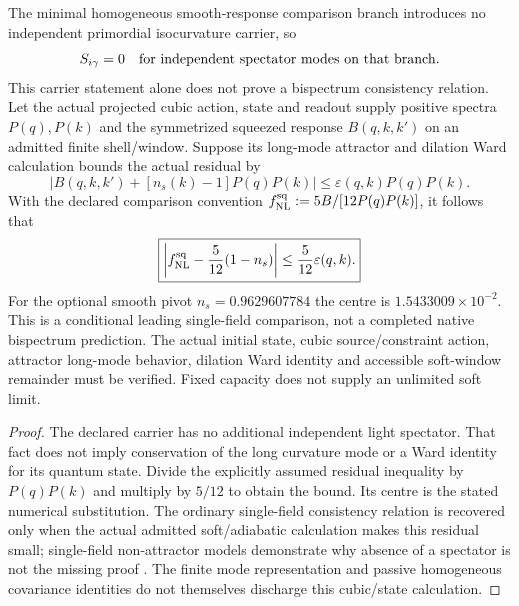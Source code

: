 \documentclass[12pt,a4paper]{article}
\begin{document}
\begin{corollary}
\label{p8:cor:minimal-adiabatic-fnl}
The minimal homogeneous smooth-response comparison branch introduces no
independent primordial isocurvature carrier, so
\begin{equation}
\label{p8:eq:minimal-isocurvature-zero}
 S_{i\gamma}=0\quad\hbox{for independent spectator modes on that branch}.
\end{equation}
This carrier statement alone does not prove a bispectrum consistency
relation. Let the actual projected cubic action, state and readout supply
positive spectra $P(q),P(k)$ and the symmetrized squeezed response
$B(q,k,k')$ on an admitted finite shell/window. Suppose its long-mode
attractor and dilation Ward calculation bounds the actual residual by
\[
 |B(q,k,k')+[n_s(k)-1]P(q)P(k)|
 \le\varepsilon(q,k)P(q)P(k).
\]
With the declared comparison convention
$f_{\rm NL}^{\rm sq}:=5B/[12P(q)P(k)]$, it follows that
\begin{equation}
\label{p8:eq:single-field-fnl-local}
 \boxed{\left|f_{\rm NL}^{\rm sq}-\frac5{12}(1-n_s)\right|
 \le\frac5{12}\varepsilon(q,k).}
\end{equation}
For the optional smooth pivot $n_s=0.9629607784$ the centre is
$1.5433009\times10^{-2}$. This is a conditional leading single-field
comparison, not a completed native bispectrum prediction. The actual
initial state, cubic source/constraint action, attractor long-mode
behavior, dilation Ward identity and accessible soft-window remainder
must be verified. Fixed capacity does not supply an unlimited soft limit.
\end{corollary}
\begin{proof}
The declared carrier has no additional independent light spectator.
That fact does not imply conservation of the long curvature mode or a
Ward identity for its quantum state. Divide the explicitly assumed
residual inequality by $P(q)P(k)$ and multiply by $5/12$ to obtain the
bound. Its centre is the stated numerical substitution. The ordinary
single-field consistency relation is recovered only when the actual
admitted soft/adiabatic calculation makes this residual small;
single-field non-attractor models demonstrate why absence of a spectator
is not the missing proof \cite{Maldacena2003,RepairNamjoo2013}.
The finite mode representation and passive homogeneous covariance
identities do not themselves discharge this cubic/state calculation.
\end{proof}
\end{document}
